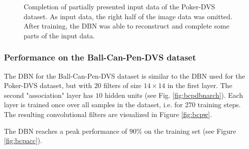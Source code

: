 \begin{figure}[h!]
\begin{subfigure}{.25\textwidth}
  		\label{fig:sub1}
	\end{subfigure}%
	\caption[Completion of partially presented input data of the Poker-DVS dataset.]{Completion of partially presented input data of the Poker-DVS dataset. As input data, the right half of the image data was omitted. After training, the DBN was able to reconstruct and complete some parts of the input data.}
	\label{fig:pokercompl}
\end{figure}

\clearpage

\subsubsection{Performance on the Ball-Can-Pen-DVS dataset} \label{c:pokerexp}

The DBN for the Ball-Can-Pen-DVS dataset is similar to the DBN used for the Poker-DVS dataset, but with $20$ filters of size $14 \times 14$ in the first layer. The second "association" layer has $10$ hidden units (see Fig. \ref{fig:bcpdbnarch}).
Each layer is trained once over all samples in the dataset, i.e. for 270 training steps. 
The resulting convolutional filters are visualized in Figure \ref{fig:bcpw}.

The DBN reaches a peak performance of $90 \%$ on the training set (see Figure \ref{fig:bcpacc}). 

